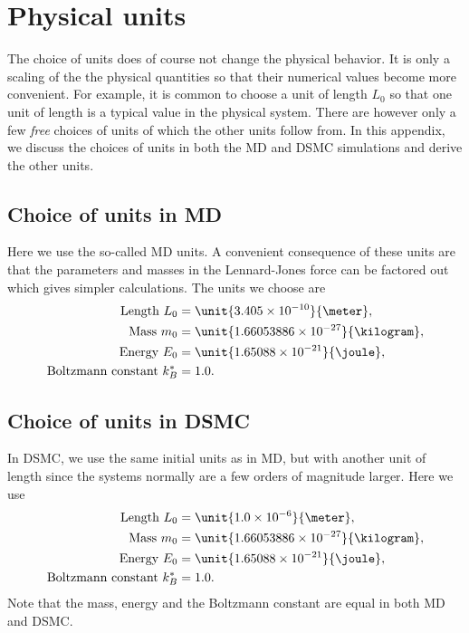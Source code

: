 \chapter{Physical units}
The choice of units does of course not change the physical behavior. It is only a scaling of the the physical quantities so that their numerical values become more convenient. For example, it is common to choose a unit of length $L_0$ so that one unit of length is a typical value in the physical system. There are however only a few \textit{free} choices of units of which the other units follow from. In this appendix, we discuss the choices of units in both the MD and DSMC simulations and derive the other units.
\section{Choice of units in MD}
Here we use the so-called MD units. A convenient consequence of these units are that the parameters and masses in the Lennard-Jones force can be factored out which gives simpler calculations. The units we choose are
\begin{align}
	\text{Length } L_0 &= \unit{3.405\e{-10}}{\meter},\\
	\text{Mass } m_0 &= \unit{1.66053886\e{-27}}{\kilogram},\\
	\text{Energy } E_0 &= \unit{1.65088\e{-21}}{\joule},\\
	\text{Boltzmann constant } k_B^* &= 1.0.
\end{align}
\section{Choice of units in DSMC}
In DSMC, we use the same initial units as in MD, but with another unit of length since the systems normally are a few orders of magnitude larger. Here we use
\begin{align}
	\text{Length } L_0 &= \unit{1.0\e{-6}}{\meter},\\
	\text{Mass } m_0 &= \unit{1.66053886\e{-27}}{\kilogram},\\
	\text{Energy } E_0 &= \unit{1.65088\e{-21}}{\joule},\\
	\text{Boltzmann constant } k_B^* &= 1.0.
\end{align}
Note that the mass, energy and the Boltzmann constant are equal in both MD and DSMC. 
